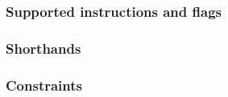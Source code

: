 
\subsubsection{Supported instructions and flags }   \label{hub: instruction handling: mcopy: instructions and flags}    %
\subsubsection{Shorthands                       }   \label{hub: instruction handling: mcopy: shorthands}                %
\subsubsection{Constraints                      }   \label{hub: instruction handling: mcopy: constraints}               %

